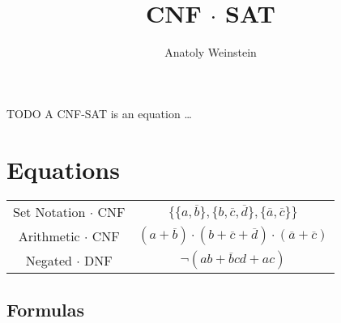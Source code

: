 \documentclass[12pt, letterpaper]{article}
\title{CNF $\cdot$ SAT}
\author{Anatoly Weinstein}
\begin{document}
    \maketitle

    TODO A CNF-SAT is an equation \ldots




    \section{Equations}

    \begin{center}
        \begin{tabular}{cc}
            Set Notation $\cdot$ CNF & $\{\{a, \overline b\}, \{b, \overline c, \overline d\}, \{\overline a, \overline c\}\}$ \\[5px]
            Arithmetic $\cdot$ CNF & $(a+\overline b) \cdot (b +\overline c +\overline d) \cdot (\overline a +\overline c)$ \\[5px]
            Negated $\cdot$ DNF & $\lnot(ab + \overline bcd + ac)$ \\
        \end{tabular}
    \end{center}

    \subsection*{Formulas}
\end{document}
